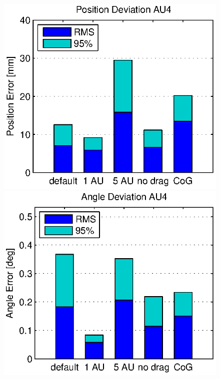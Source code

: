 \begin{figure}[hbtp]
\centering
\includegraphics[scale=.72]{images/results/err_cmp_sim_pos.eps}
\includegraphics[scale=.72]{images/results/err_cmp_sim_angle.eps}

\end{figure}
